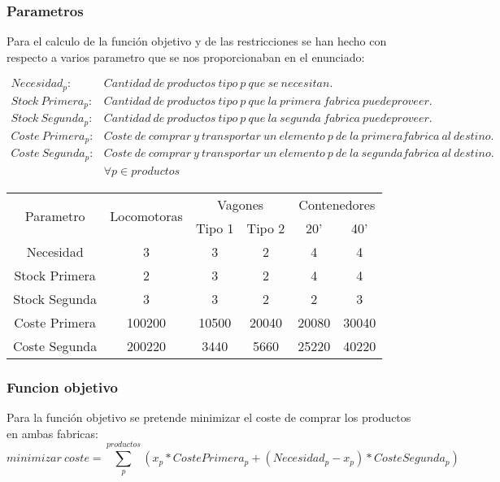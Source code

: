 \documentclass[11pt,spanish]{article}
\begin{document}
			\subsubsection{Parametros}
			Para el calculo de la función objetivo y de las restricciones se han hecho con respecto a varios parametro que se nos proporcionaban en el enunciado:
			
			\begin{align*}
			Necesidad_p:& Cantidad\ de\ productos\ tipo\ p\ que\ se\ necesitan. \\
			Stock\ Primera_p:& Cantidad\ de\ productos\ tipo\ p\ que\ la\ primera\ fabrica\ puede proveer. \\
			Stock\ Segunda_p:& Cantidad\ de\ productos\ tipo\ p\ que\ la\ segunda\ fabrica\ puede proveer. \\
			Coste\ Primera_p:& Coste\ de\ comprar\ y\ transportar\ un\ elemento\ p\ de\ la\ primera fabrica\ al\ destino. \\
			Coste\ Segunda_p:& Coste\ de\ comprar\ y\ transportar\ un\ elemento\ p\ de\ la\ segunda fabrica\ al\ destino. \\
			&\forall p \in productos 
			\end{align*}
			\label{tab:params1}
			\begin{tabular}{ |c||c|c|c|c|c|  }	
			 	\hline
			 	\multirow{2}{*}{Parametro} & \multirow{2}{*}{Locomotoras} &  \multicolumn{2}{|c|}{Vagones} & \multicolumn{2}{|c|}{Contenedores} \\
			 	& & Tipo 1 & Tipo 2 & 20' & 40'\\
			 	\hline
			 	Necesidad & 3 & 3 & 2 & 4 & 4 \\
			 	Stock Primera & 2 & 3 & 2 & 4 & 4 \\
			 	Stock Segunda & 3 & 3 & 2 & 2 & 3 \\
 			 	Coste Primera & 100200 & 10500 & 20040 & 20080 & 30040 \\
			 	Coste Segunda & 200220 & 3440 & 5660 & 25220 & 40220 \\
				\hline
			\end{tabular}

			\subsubsection{Funcion objetivo}
			Para la función objetivo se pretende minimizar el coste de comprar los productos en ambas fabricas:
			$$
			minimizar\ coste = \sum_p^{productos} (x_p * Coste Primera_p + (Necesidad_p - x_p) * Coste Segunda_p)
			$$
\end{document}
